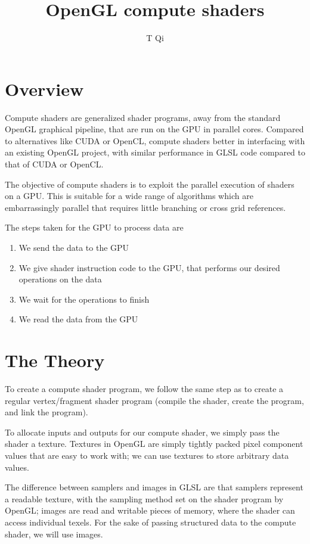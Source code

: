 \documentclass[11pt]{article}
\title{OpenGL compute shaders}
\author{T Qi}
\begin{document}
	
\maketitle
\newpage

\section{Overview}
Compute shaders are generalized shader programs, away from the standard OpenGL graphical pipeline, that are run on the GPU in parallel cores. Compared to alternatives like CUDA or OpenCL, compute shaders better in interfacing with an existing OpenGL project, with similar performance in GLSL code compared to that of CUDA or OpenCL.

The objective of compute shaders is to exploit the parallel execution of shaders on a GPU. This is suitable for a wide range of algorithms which are embarrassingly parallel that requires little branching or cross grid references.

The steps taken for the GPU to process data are
\begin{enumerate}
	\item We send the data to the GPU
	\item We give shader instruction code to the GPU, that performs our desired operations on the data
	\item We wait for the operations to finish
	\item We read the data from the GPU
\end{enumerate}


\section{The Theory}
To create a compute shader program, we follow the same step as to create a regular vertex/fragment shader program (compile the shader, create the program, and link the program). 

To allocate inputs and outputs for our compute shader, we simply pass the shader a texture. Textures in OpenGL are simply tightly packed pixel component values that are easy to work with; we can use textures to store arbitrary data values.

The difference between samplers and images in GLSL are that samplers represent a readable texture, with the sampling method set on the shader program by OpenGL; images are read and writable pieces of memory, where the shader can access individual texels. For the sake of passing structured data to the compute shader, we will use images.
\end{document}
